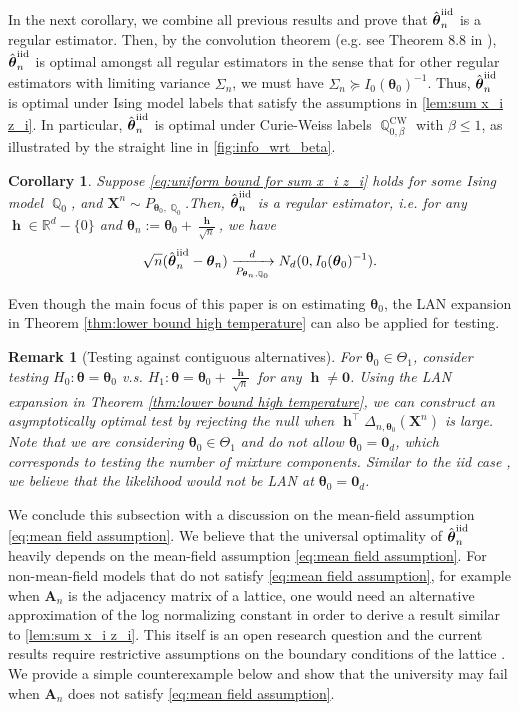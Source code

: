 \documentclass[preprint,reqno]{imsart}
\newtheorem{cor}[thm]{Corollary}
\newtheorem{remark}{Remark}[section]
\newcommand{\ttheta}{\boldsymbol{\theta}}
\DeclareMathOperator{\bh}{\textbf{h}}
\DeclareMathOperator{\QQ}{\mathbb{Q}}
\newcommand{\A}{\mathbf{A}}
\newcommand{\X}{\mathbf{X}}
\newcommand{\thetaiid}{\hat{\boldsymbol \theta}^{\text{iid}}_{\mathnormal n}}
\begin{document}
In the next corollary, we combine all previous results and prove that $\thetaiid$ is a regular estimator.
%
Then, by the convolution theorem (e.g. see Theorem 8.8 in \cite{van2000asymptotic}), $\thetaiid$ is optimal amongst all regular estimators in the sense that for other regular estimators with limiting variance $\Sigma_n$, we must have $\Sigma_n \succeq I_0(\ttheta_0)^{-1}$. Thus, $\thetaiid$ is optimal under Ising model labels that satisfy the assumptions in \cref{lem:sum x_i z_i}. In particular, $\thetaiid$ is optimal under Curie-Weiss labels $\QQ_{0,\beta}^{\text{CW}}$ with $\beta \le 1$, as illustrated by the straight line in \cref{fig:info_wrt_beta}.
%

\begin{cor}\label{cor:high tmp}
    Suppose \eqref{eq:uniform bound for sum x_i z_i} holds for some Ising model $\QQ_0$, and $\X^n \sim P_{\ttheta_0,\QQ_{0}}$.Then, $\thetaiid$ is a regular estimator, i.e. for any $\bh \in \mathbb{R}^d - \{0\}$ and $\ttheta_n := \ttheta_0 + \frac{\bh}{\sqrt{n}}$, we have $$\sqrt{n}(\thetaiid - \ttheta_n) \xrightarrow[P_{\ttheta_n,\QQ_{0}}]{d} N_d(0, I_0(\ttheta_0)^{-1}).$$
\end{cor}

Even though the main focus of this paper is on estimating $\ttheta_0$, the LAN expansion in Theorem \ref{thm:lower bound high temperature} can also be applied for testing.
\begin{remark}[Testing against contiguous alternatives]\label{rmk:testing high temperature}
    For $\ttheta_0 \in \Theta_1$, consider testing $H_0: \ttheta= \ttheta_0$ v.s. $H_1: \ttheta= \ttheta_0 + \frac{\bh}{\sqrt{n}}$ for any $\bh \neq \mathbf{0}$. Using the LAN expansion in Theorem \ref{thm:lower bound high temperature}, we can construct an asymptotically optimal test by rejecting the null when $\bh^\top \Delta_{n, \ttheta_0}(\X^n)$ is large. Note that we are considering $\ttheta_0 \in \Theta_1$ and do not allow $\ttheta_0 = \mathbf{0}_d$, which corresponds to testing the number of mixture components. Similar to the iid case \citep{goffinet1992testing}, we believe that the likelihood would not be LAN at $\ttheta_0 = \mathbf{0}_d$.
\end{remark}

We conclude this subsection with a discussion on  
the mean-field assumption \eqref{eq:mean field assumption}. We believe that the universal optimality of $\thetaiid$ heavily depends on 
%
the mean-field assumption \eqref{eq:mean field assumption}. For non-mean-field models that do not satisfy \eqref{eq:mean field assumption}, for example when $ \A_n$ is the adjacency matrix of a lattice, one would need an alternative approximation of the log normalizing constant in order to derive a result similar to \cref{lem:sum x_i z_i}. This itself is an open research question and the current results require restrictive assumptions on the boundary conditions of the lattice \citep{chatterjee2019central}. We provide a simple counterexample below and show that the university may fail when $ \A_n$ does not satisfy \eqref{eq:mean field assumption}.
\end{document}
